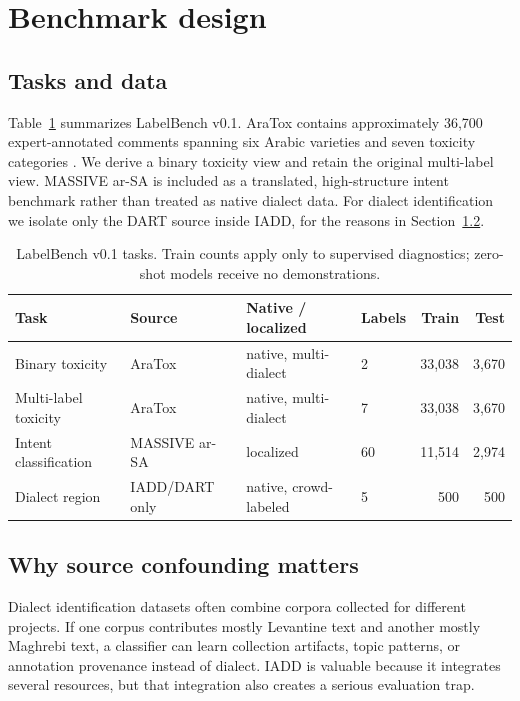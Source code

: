 \documentclass[10pt,twocolumn]{article}
\begin{document}
\section{Benchmark design}
\subsection{Tasks and data}
Table~\ref{tab:tasks} summarizes LabelBench v0.1. AraTox contains
approximately 36,700 expert-annotated comments spanning six Arabic varieties
and seven toxicity categories \citep{aratox2026}. We derive a binary toxicity
view and retain the original multi-label view. MASSIVE ar-SA is included as a
translated, high-structure intent benchmark rather than treated as native
dialect data. For dialect identification we isolate only the DART source inside
IADD, for the reasons in Section~\ref{sec:source-confound}.

\begin{table}[t]
\centering
\small
\caption{LabelBench v0.1 tasks. Train counts apply only to supervised
diagnostics; zero-shot models receive no demonstrations.}
\label{tab:tasks}
\begin{tabular}{llllrr}
\toprule
Task & Source & Native / localized & Labels & Train & Test \\
\midrule
Binary toxicity & AraTox & native, multi-dialect & 2 & 33,038 & 3,670 \\
Multi-label toxicity & AraTox & native, multi-dialect & 7 & 33,038 & 3,670 \\
Intent classification & MASSIVE ar-SA & localized & 60 & 11,514 & 2,974 \\
Dialect region & IADD/DART only & native, crowd-labeled & 5 & 500 & 500 \\
\bottomrule
\end{tabular}
\end{table}

\subsection{Why source confounding matters}
\label{sec:source-confound}
Dialect identification datasets often combine corpora collected for different
projects. If one corpus contributes mostly Levantine text and another mostly
Maghrebi text, a classifier can learn collection artifacts, topic patterns, or
annotation provenance instead of dialect. IADD is valuable because it
integrates several resources, but that integration also creates a serious
evaluation trap.
\end{document}
